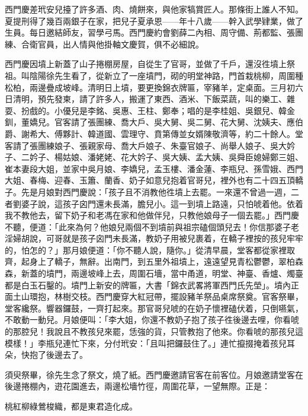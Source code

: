 西門慶差玳安兒擡了許多酒、肉、燒餅來，與他家犒賞匠人。那條街上誰人不知。夏提刑得了幾百兩銀子在家，把兒子夏承恩——年十八歲——幹入武學肄業，做了生員。{}每日邀結師友，習學弓馬。西門慶約會劉薛二內相、周守備、荊都監、張團練、合衛官員，出人情與他掛軸文慶賀，俱不必細說。

西門慶因墳上新蓋了山子捲棚房屋，自從生了官哥，並做了千戶，還沒徃墳上祭祖。叫陰陽徐先生看了，從新立了一座墳門，砌的明堂神路，門首栽桃柳，周圍種松柏，兩邊疊成坡峰。清明日上墳，要更換錦衣牌匾，宰豬羊，定桌面。三月初六日清明，預先發柬，請了許多人，搬運了東西、酒米、下飯菜蔬，叫的樂工、雜耍、扮戲的。小優兒是李銘、吳惠、王柱、鄭奉；唱的是李桂姐、吳銀兒、韓金釧，董嬌兒。官客請了張團練、喬大戶、吳大舅、吳二舅、花大舅、沈姨夫、應伯爵、謝希大、傅夥計、韓道國、雲理守、賁第傳並女婿陳敬濟等，約二十餘人。堂客請了張團練娘子、張親家母、喬大戶娘子、朱臺官娘子、尚舉人娘子、吳大妗子、二妗子、楊姑娘、潘姥姥、花大妗子、吳大姨、孟大姨、吳舜臣媳婦鄭三姐、崔本妻段大姐，並家中吳月娘、李嬌兒，孟玉樓、潘金蓮、李瓶兒、孫雪娥、西門大姐、春梅、迎春、玉簫、蘭香、奶子如意兒抱着官哥兒，裡外也有二十四五頂轎子。先是月娘對西門慶說：「孩子且不消教他徃墳上去罷。一來還不曾過一週，二者劉婆子說，這孩子囟門還未長滿，膽兒小。這一到墳上路遠，只怕唬着他。{}依着我不教他去，留下奶子和老馮在家和他做伴兒，只教他娘母子一個去罷。」西門慶不聽，便道：「此來為何？他娘兒兩個不到墳前與祖宗磕個頭兒去！你信那婆子老淫婦胡說，可哥就是孩子囟門未長滿，教奶子用被兒裹着，在轎子裡按的孩兒牢牢的，怕怎的？」那月娘便道：「你不聽人說，隨你。」從清早晨，堂客都從家裡取齊，起身上了轎子，無辭。出南門，到五里外祖墳上，遠遠望見青松鬱鬱，翠柏森森，新蓋的墳門，兩邊坡峰上去，周圍石墻，當中甬道，明堂、神臺、香爐、燭臺都是白玉石鑿的。墳門上新安的牌匾，大書「錦衣武畧將軍西門氏先塋」。墳內正面土山環抱，林樹交枝。西門慶穿大紅冠帶，擺設豬羊祭品桌席祭奠。官客祭畢，堂客纔祭。響器鑼鼓，一齊打起來。那官哥兒唬的在奶子懷裡磕伏着，只倒嚥氣，不敢動一動兒。月娘便叫：「李大姐，你還不教奶子抱了孩子徃後邊去哩，你看唬的那腔兒！{}我說且不教孩兒來罷，恁強的貨，只管教抱了他來。你看唬的那孩兒這模樣！」李瓶兒連忙下來，分付玳安：「且叫把鑼鼓住了。」連忙攛掇掩着孩兒耳朵，快抱了後邊去了。

須臾祭畢，徐先生念了祭文，燒了紙。西門慶邀請官客在前客位。月娘邀請堂客在後邊捲棚內，逰花園進去，兩邊松墻竹徑，周圍花草，一望無際。正是：

\begin{myquote}
桃紅柳綠鶯梭織，都是東君造化成。
\end{myquote}

